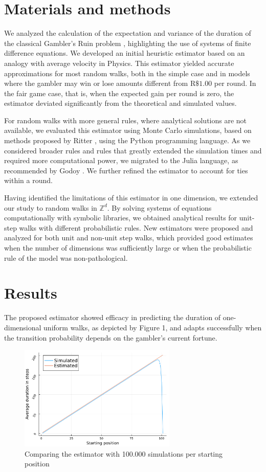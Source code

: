 \documentclass[a4paper,10pt,twocolumn]{article}
\begin{document}
\section{Materials and methods}

We analyzed the calculation of the expectation and variance of the duration
of the classical Gambler’s Ruin problem \cite{andel_variance_2012}, highlighting
the use of systems of finite difference equations. We developed an initial heuristic
estimator based on an analogy with average velocity in Physics. This estimator yielded
accurate approximations for most random walks, both in the simple case and in
models where the gambler may win or lose amounts different from
$\mathrm{R}\$1.00$ per round. In the fair game case, that is, when the expected gain
per round is zero, the estimator deviated significantly from the theoretical and
simulated values.

For random walks with more general rules, where analytical solutions are not
available, we evaluated this estimator using Monte Carlo simulations, based on
methods proposed by Ritter \cite{ritter_determining_2011}, using the Python
programming language. As we considered broader rules and rules that greatly
extended the simulation times and required more computational power, we
migrated to the Julia language, as recommended by Godoy
\cite{godoy_evaluating_2023}. We further refined the estimator to account for
ties within a round.

Having identified the limitations of this estimator in one dimension, we extended
our study to random walks in $\mathbb{Z}^d$. By solving systems of equations
computationally with symbolic libraries, we obtained analytical results for unit-step
walks with different probabilistic rules. New estimators were proposed and analyzed
for both unit and non-unit step walks, which provided good estimates when the
number of dimensions was sufficiently large or when the probabilistic rule of the
model was non-pathological.

\section{Results}

The proposed estimator showed efficacy in predicting the duration of
one-dimensional uniform walks, as depicted by Figure 1, and adapts successfully
when the transition probability depends on the gambler's current fortune.

\begin{figure}[H]
    \centering
    \includegraphics[width=7.5cm]{"graficoest-en.pdf"}
    \centering
    \caption{Comparing the estimator with 100.000 simulations per starting
    position}
\end{figure}
\end{document}
